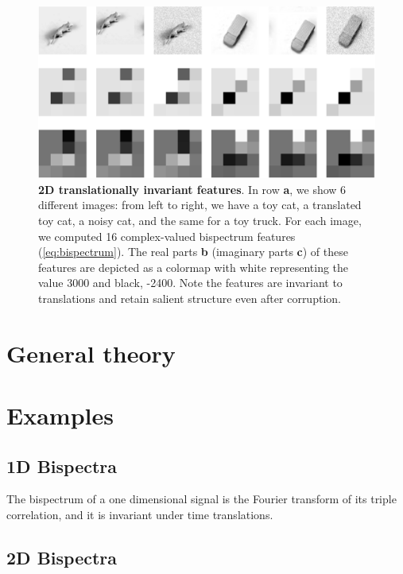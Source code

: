 \documentclass[letterpaper, 10pt]{article}
\theoremstyle{definition}
\begin{document}
\begin{figure}
\begin{center}
   \includegraphics[width=.9 \linewidth]{figs/bispect_examples_2.png} 
\caption{\textbf{2D translationally invariant features}. In row \textbf{a}, we show 6 different images:  from left to right, we have a toy cat, a translated toy cat, a noisy cat, and the same for a toy truck.  For each image, we computed 16 complex-valued bispectrum features (\ref{eq:bispectrum}). The real parts \textbf{b} (imaginary parts \textbf{c}) of these features are depicted as a colormap with white representing the value 3000 and black, -2400.  Note the features are invariant to translations and retain salient structure even after corruption.}
\label{bispetrum_intuition2}
\end{center}
\end{figure}

\section{General theory}
\label{Sec:General}


\section{Examples}

\subsection{1D Bispectra}

The bispectrum of a one dimensional signal is the Fourier transform of its triple correlation, and it is invariant under time translations.

\subsection{2D Bispectra}
\end{document}
